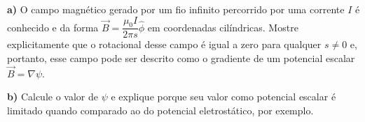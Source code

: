 \textbf{a)} O campo magnético gerado por um fio infinito percorrido por uma corrente $I$ é conhecido e da forma $\vec{B} = \dfrac{\mu_0 I}{2\pi s}\hat{\phi}$ em coordenadas cilíndricas. Mostre explicitamente que o rotacional desse campo é igual a zero para qualquer $s \neq 0$ e, portanto, esse campo pode ser descrito como o gradiente de um potencial escalar $\vec{B} = \nabla\psi$.

\textbf{b)} Calcule o valor de $\psi$ e explique porque seu valor como potencial escalar é limitado quando comparado ao do potencial eletrostático, por exemplo.
